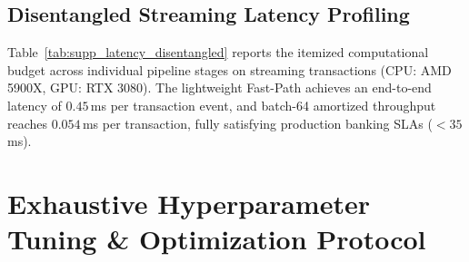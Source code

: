 \documentclass[a4paper,fleqn,twocolumn]{article}
\begin{document}
\subsection{Disentangled Streaming Latency Profiling}

Table~\ref{tab:supp_latency_disentangled} reports the itemized computational budget across individual pipeline stages on streaming transactions (CPU: AMD 5900X, GPU: RTX 3080). The lightweight Fast-Path achieves an end-to-end latency of $0.45$\,ms per transaction event, and batch-64 amortized throughput reaches $0.054$\,ms per transaction, fully satisfying production banking SLAs ($< 35$\,ms).

\begin{table}[htbp]
\centering
\caption{Fine-Grained Latency Profiling per Transaction Event (CPU: AMD 5900X, GPU: RTX 3080).}
\label{tab:supp_latency_disentangled}
\end{table}

\section{Exhaustive Hyperparameter Tuning \& Optimization Protocol}
\label{sec:supp_hyperparameters}
\end{document}

